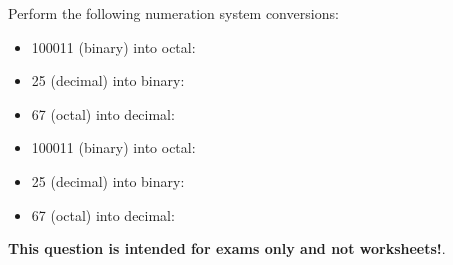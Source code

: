 

Perform the following numeration system conversions:

\begin{itemize}
\item{} 100011 (binary) into octal: \underbar{\hskip 50pt}
\vskip 10pt
\item{} 25 (decimal) into binary: \underbar{\hskip 50pt}
\vskip 10pt
\item{} 67 (octal) into decimal: \underbar{\hskip 50pt}
\end{itemize}







\begin{itemize}
\item{} 100011 (binary) into octal: 
\vskip 10pt
\item{} 25 (decimal) into binary: 
\vskip 10pt
\item{} 67 (octal) into decimal: 
\end{itemize}







{\bf This question is intended for exams only and not worksheets!}.


